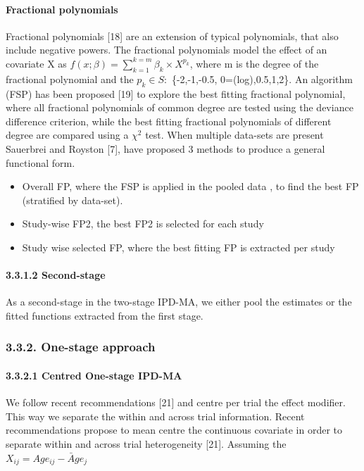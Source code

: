 \documentclass[14pt,]{article}
\providecommand{\tightlist}{%
  \setlength{\itemsep}{0pt}\setlength{\parskip}{0pt}}
\let\oldparagraph\paragraph
\renewcommand{\paragraph}[1]{\oldparagraph{#1}\mbox{}}
\begin{document}
\paragraph{Fractional polynomials}\label{fractional-polynomials}

Fractional polynomials {[}18{]} are an extension of typical polynomials,
that also include negative powers. The fractional polynomials model the
effect of an covariate X as
\(f(x;\beta) = \sum_{k=1}^{k=m} \beta_{k} \times X^{p_{k}}\), where m is
the degree of the fractional polynomial and the \(p_k \in S :\)
\{-2,-1,-0.5, 0=(log),0.5,1,2\}. An algorithm (FSP) has been proposed
{[}19{]} to explore the best fitting fractional polynomial, where all
fractional polynomials of common degree are tested using the deviance
difference criterion, while the best fitting fractional polynomials of
different degree are compared using a \(\chi^2\) test. When multiple
data-sets are present Sauerbrei and Royston {[}7{]}, have proposed 3
methods to produce a general functional form.

\begin{itemize}
\tightlist
\item
  Overall FP, where the FSP is applied in the pooled data , to find the
  best FP (stratified by data-set).
\item
  Study-wise FP2, the best FP2 is selected for each study
\item
  Study wise selected FP, where the best fitting FP is extracted per
  study
\end{itemize}

\paragraph{3.3.1.2 Second-stage}\label{second-stage}

As a second-stage in the two-stage IPD-MA, we either pool the estimates
or the fitted functions extracted from the first stage.

\subsubsection{3.3.2. One-stage approach}\label{one-stage-approach}

\paragraph{3.3.2.1 Centred One-stage
IPD-MA}\label{centred-one-stage-ipd-ma}

We follow recent recommendations {[}21{]} and centre per trial the
effect modifier. This way we separate the within and across trial
information. Recent recommendations propose to mean centre the
continuous covariate in order to separate within and across trial
heterogeneity {[}21{]}. Assuming the \(X_{ij} = Age_{ij} - \bar Age_j\)
\end{document}
